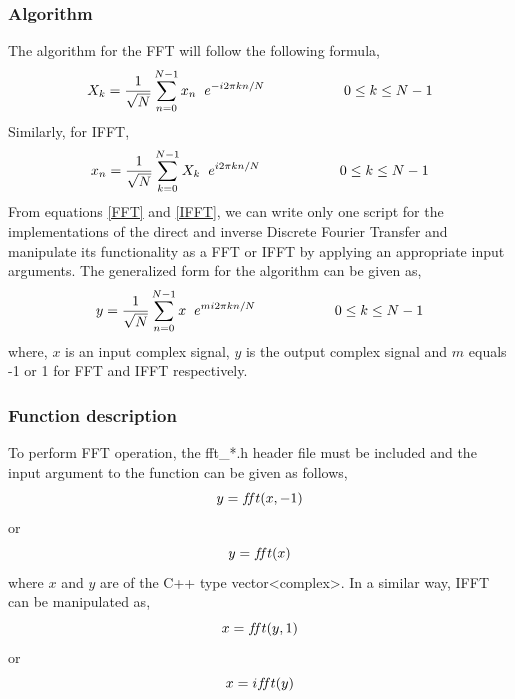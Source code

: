 \subsubsection{Algorithm}
The algorithm for the FFT will follow the following formula,
\begin{equation}
X_k =\dfrac{1}{\sqrt{N}}\sum\limits_{n=0}^{N-1} x_n \hspace{2mm} e^{-i2\pi kn/N}		\hspace{2cm}	0\leq k \leq N-1
\label{FFT}
\end{equation}
Similarly, for IFFT,
\begin{equation}
x_n =\frac{1}{\sqrt{N}} \sum\limits_{k=0}^{N-1} X_k \hspace{2mm}  e^{i2\pi kn/N}		\hspace{2cm}	0\leq k \leq N-1
\label{IFFT}
\end{equation}
From equations \ref{FFT} and \ref{IFFT}, we can write only one script for the implementations of the direct and inverse Discrete Fourier Transfer and manipulate its functionality as a FFT or IFFT by applying an appropriate input arguments. The generalized form for the algorithm can be given as,
\begin{equation}
y =\frac{1}{\sqrt{N}} \sum\limits_{n=0}^{N-1} x \hspace{2mm}  e^{m  i2\pi kn/N}		\hspace{2cm}	0\leq k \leq N-1
\label{FT}
\end{equation}
where, $x$ is an input complex signal, $y$ is the output complex signal and $m$ equals -1 or 1 for FFT and IFFT respectively.

\subsubsection{Function description}
To perform FFT operation, the fft\_*.h header file must be included and the input argument to the function can be given as follows,
\begin{equation*}
y=f\hspace{-0.85mm}ft(x,-1)
\end{equation*}
or
\begin{equation*}
	y = f\hspace{-0.85mm}ft(x)
\end{equation*}
where $x$ and $y$ are of the C++ type vector<complex>. In a similar way, IFFT can be manipulated as,
\begin{equation*}
x = f\hspace{-0.85mm}ft(y,1)
\end{equation*}
or
\begin{equation*}
	x = if\hspace{-0.85mm}ft(y)
\end{equation*}

